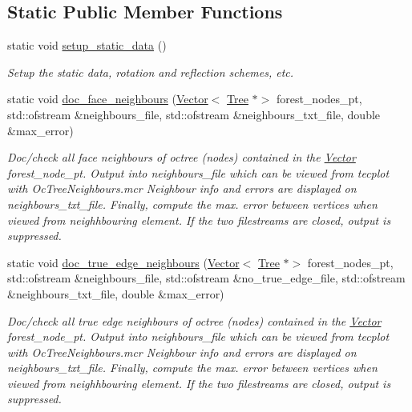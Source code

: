 \subsection*{Static Public Member Functions}
\begin{DoxyCompactItemize}
\item 
static void \hyperlink{classoomph_1_1OcTree_a5d7b0830cd9c913786e23259c69c71a0}{setup\+\_\+static\+\_\+data} ()
\begin{DoxyCompactList}\small\item\em Setup the static data, rotation and reflection schemes, etc. \end{DoxyCompactList}\item 
static void \hyperlink{classoomph_1_1OcTree_a559d4608359c24b0cd08a25e6990f5a1}{doc\+\_\+face\+\_\+neighbours} (\hyperlink{classoomph_1_1Vector}{Vector}$<$ \hyperlink{classoomph_1_1Tree}{Tree} $\ast$$>$ forest\+\_\+nodes\+\_\+pt, std\+::ofstream \&neighbours\+\_\+file, std\+::ofstream \&neighbours\+\_\+txt\+\_\+file, double \&max\+\_\+error)
\begin{DoxyCompactList}\small\item\em Doc/check all face neighbours of octree (nodes) contained in the \hyperlink{classoomph_1_1Vector}{Vector} forest\+\_\+node\+\_\+pt. Output into neighbours\+\_\+file which can be viewed from tecplot with Oc\+Tree\+Neighbours.\+mcr Neighbour info and errors are displayed on neighbours\+\_\+txt\+\_\+file. Finally, compute the max. error between vertices when viewed from neighhbouring element. If the two filestreams are closed, output is suppressed. \end{DoxyCompactList}\item 
static void \hyperlink{classoomph_1_1OcTree_aad0aadd0d308229ee85fd9e34bb21698}{doc\+\_\+true\+\_\+edge\+\_\+neighbours} (\hyperlink{classoomph_1_1Vector}{Vector}$<$ \hyperlink{classoomph_1_1Tree}{Tree} $\ast$$>$ forest\+\_\+nodes\+\_\+pt, std\+::ofstream \&neighbours\+\_\+file, std\+::ofstream \&no\+\_\+true\+\_\+edge\+\_\+file, std\+::ofstream \&neighbours\+\_\+txt\+\_\+file, double \&max\+\_\+error)
\begin{DoxyCompactList}\small\item\em Doc/check all true edge neighbours of octree (nodes) contained in the \hyperlink{classoomph_1_1Vector}{Vector} forest\+\_\+node\+\_\+pt. Output into neighbours\+\_\+file which can be viewed from tecplot with Oc\+Tree\+Neighbours.\+mcr Neighbour info and errors are displayed on neighbours\+\_\+txt\+\_\+file. Finally, compute the max. error between vertices when viewed from neighhbouring element. If the two filestreams are closed, output is suppressed. \end{DoxyCompactList}\item 

\end{DoxyCompactItemize}
